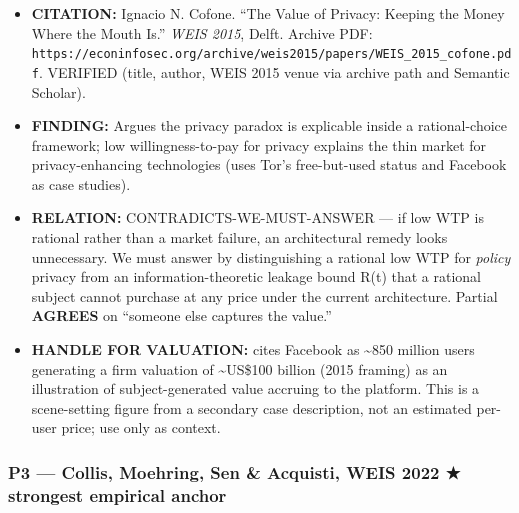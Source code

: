 \documentclass[
  11pt,
]{article}
\providecommand{\tightlist}{%
  \setlength{\itemsep}{0pt}\setlength{\parskip}{0pt}}
\begin{document}
\begin{itemize}
\tightlist
\item
  \textbf{CITATION:} Ignacio N. Cofone. ``The Value of Privacy: Keeping
  the Money Where the Mouth Is.'' \emph{WEIS 2015}, Delft. Archive PDF:
  \texttt{https://econinfosec.org/archive/weis2015/papers/WEIS\_2015\_cofone.pdf}.
  VERIFIED (title, author, WEIS 2015 venue via archive path and Semantic
  Scholar).
\item
  \textbf{FINDING:} Argues the privacy paradox is explicable inside a
  rational-choice framework; low willingness-to-pay for privacy explains
  the thin market for privacy-enhancing technologies (uses Tor's
  free-but-used status and Facebook as case studies).
\item
  \textbf{RELATION:} CONTRADICTS-WE-MUST-ANSWER --- if low WTP is
  rational rather than a market failure, an architectural remedy looks
  unnecessary. We must answer by distinguishing a rational low WTP for
  \emph{policy} privacy from an information-theoretic leakage bound R(t)
  that a rational subject cannot purchase at any price under the current
  architecture. Partial \textbf{AGREES} on ``someone else captures the
  value.''
\item
  \textbf{HANDLE FOR VALUATION:} cites Facebook as \textasciitilde850
  million users generating a firm valuation of \textasciitilde US\$100
  billion (2015 framing) as an illustration of subject-generated value
  accruing to the platform. This is a scene-setting figure from a
  secondary case description, not an estimated per-user price; use only
  as context.
\end{itemize}

\subsubsection{P3 --- Collis, Moehring, Sen \& Acquisti, WEIS 2022 ★
strongest empirical
anchor}\label{p3-collis-moehring-sen-acquisti-weis-2022-strongest-empirical-anchor}
\end{document}
